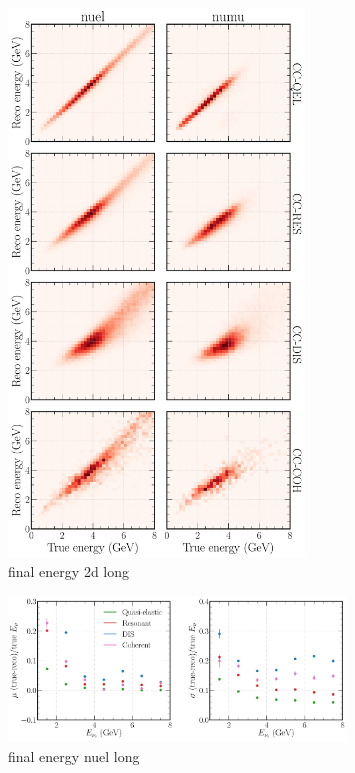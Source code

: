 \begin{figure} %
    \includegraphics[width=0.7\textwidth]{diagrams/7-cvn/chipsnet/final_energy_2d.pdf}
    \caption[final energy 2d short]
    {final energy 2d long}
    \label{fig:final_energy_2d}
\end{figure}

\begin{figure} %
    \includegraphics[width=0.8\textwidth]{diagrams/7-cvn/chipsnet/final_energy_nuel.pdf}
    \caption[final energy nuel short]
    {final energy nuel long}
    \label{fig:final_energy_nuel}
\end{figure}

